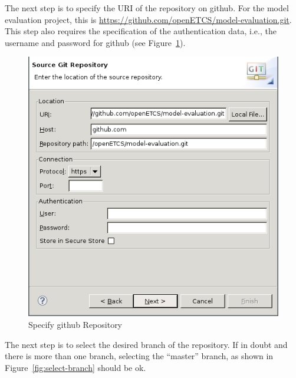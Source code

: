 \documentclass{template/openetcs_article}
\begin{document}
The next step is to specify the URI of the repository on github. For the
model evaluation project, this is
\url{https://github.com/openETCS/model-evaluation.git}. This step also requires
the specification of the authentication data, i.e., the username and password
for github (see Figure~\ref{fig:specify-git-repo}).

\begin{figure}[H]
  \centering
  \includegraphics[width=\skalierung\textwidth]{project_import_step3}
  \caption{Specify github Repository}
  \label{fig:specify-git-repo}
\end{figure}

The next step is to select the desired branch of the repository. If in doubt and
there is more than one branch, selecting the ``master'' branch, as shown in
Figure~\ref{fig:select-branch} should be ok.
\end{document}
